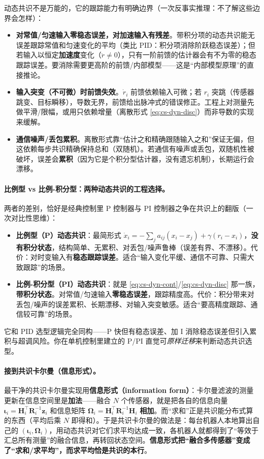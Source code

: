 动态共识不是万能的，它的跟踪能力有明确边界（一次反事实推理：不了解这些边界会怎样）：
\begin{itemize}
  \item \textbf{对常值/匀速输入零稳态误差，对加速输入有残差}。带积分项的动态共识能无误差跟踪常值和匀速变化的平均（类比 PID：积分项消除阶跃稳态误差）；但若输入以恒定\textbf{加速度}变化（$\ddot r\ne0$），只有一阶前馈的估计器会有不为零的稳态跟踪误差。要消除需要更高阶的前馈/内部模型——这是“内部模型原理”的直接推论。
  \item \textbf{输入突变（不可微）时前馈失效}。$\dot r_i$ 前馈依赖输入可微；若 $r_i$ 突跳（传感器跳变、目标瞬移），导数无界，前馈给出脉冲式的错误修正。工程上对测量先做平滑/限幅，或用只依赖增量（离散形式 \cref{eq:cs-dyn-disc}）而非导数的实现来缓解。
  \item \textbf{通信噪声/丢包累积}。离散形式靠“估计之和精确跟随输入之和”保证无偏，但这依赖每步共识精确保持总和（双随机）。若通信有噪声或丢包，双随机性被破坏，误差会\textbf{累积}（因为它是个积分型估计器，没有遗忘机制），长期运行会漂移。
\end{itemize}

\paragraph{比例型 vs 比例-积分型：两种动态共识的工程选择。}
两者的差别，恰好是经典控制里 P 控制器与 PI 控制器之争在共识上的翻版（一次对比性思维）：
\begin{itemize}
  \item \textbf{比例型（P）动态共识}：最简形式 $\dot x_i=-\sum_j a_{ij}(x_i-x_j)+\gamma(r_i-x_i)$，\textbf{没有积分状态}，结构简单、无累积、对丢包/噪声鲁棒（误差有界、不漂移）。代价：对时变输入有\textbf{稳态跟踪误差}。适合“输入变化平缓、通信不可靠、只需大致跟踪”的场景。
  \item \textbf{比例-积分型（PI）动态共识}：就是 \cref{eq:cs-dyn-cont}/\cref{eq:cs-dyn-disc} 那一族，\textbf{带积分状态}。对常值/匀速输入\textbf{零稳态误差}，跟踪精度高。代价：积分带来对丢包/噪声的误差累积、长期漂移、对输入突变敏感。适合“要高精度跟踪、通信较可靠”的场景。
\end{itemize}
它和 PID 选型逻辑完全同构——P 快但有稳态误差、加 I 消除稳态误差但引入累积与超调风险。你在单机控制里建立的 P/PI 直觉可\emph{原样迁移}来判断动态共识选型。

\paragraph{接到共识卡尔曼（信息形式）。}
最干净的共识卡尔曼实现用\textbf{信息形式（information form）}：卡尔曼滤波的测量更新在信息空间里是\textbf{加法}——融合 $N$ 个传感器，就是把各自的信息向量 $\boldsymbol{\iota}_i=\mathbf{H}_i^\top\mathbf{R}_i^{-1}\mathbf{z}_i$ 和信息矩阵 $\boldsymbol{\Omega}_i=\mathbf{H}_i^\top\mathbf{R}_i^{-1}\mathbf{H}_i$ \textbf{相加}。而“求和”正是共识能分布式算的东西（平均后乘 $N$ 即得和）。于是共识卡尔曼的做法是：每台机器人本地算出自己的 $(\boldsymbol{\iota}_i,\boldsymbol{\Omega}_i)$，用动态共识对它们求平均达成一致，各机器人就都得到了“等效于汇总所有测量”的融合信息，再转回状态空间。\textbf{信息形式把“融合多传感器”变成了“求和/求平均”，而求平均恰是共识的本行}。

